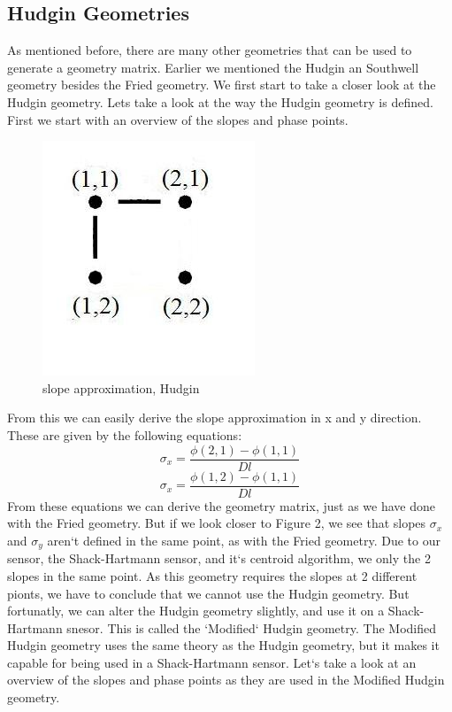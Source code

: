 \documentclass{article}
\begin{document}
\subsection{Hudgin Geometries}
As mentioned before, there are many other geometries that can be used to generate a geometry matrix. Earlier we mentioned the Hudgin an Southwell geometry besides the Fried geometry. We first start to take a closer look at the Hudgin geometry.
\newline
\newline
Lets take a look at the way the Hudgin geometry is defined. First we start with an overview of the slopes and phase points.
\begin{figure}[h!]
  \centering
  \includegraphics[scale=0.6]{figures/Hudgin}
  \caption{slope approximation, Hudgin}
\end{figure}
From this we can easily derive the slope approximation in x and y direction. These are given by the following equations:
$$ \sigma_x = \frac{\phi(2,1)-\phi(1,1)}{Dl}$$
$$ \sigma_x = \frac{\phi(1,2)-\phi(1,1)}{Dl}$$
From these equations we can derive the geometry matrix, just as we have done with the Fried geometry. But if we look closer to Figure 2, we see that slopes $\sigma_x$ and $\sigma_y$ aren`t defined in the same point, as with the Fried geometry. Due to our sensor, the Shack-Hartmann sensor, and it`s centroid algorithm, we only the 2 slopes in the same point. As this geometry requires the slopes at 2 different pionts, we have to conclude that we cannot use the Hudgin geometry. But fortunatly, we can alter the Hudgin geometry slightly, and use it on a Shack-Hartmann snesor. This is called the `Modified` Hudgin geometry.
\newline
\newline
The Modified Hudgin geometry uses the same theory as the Hudgin geometry, but it makes it capable for being used in a Shack-Hartmann sensor. Let`s take a look at an overview of the slopes and phase points as they are used in the Modified Hudgin geometry.  
\end{document}
